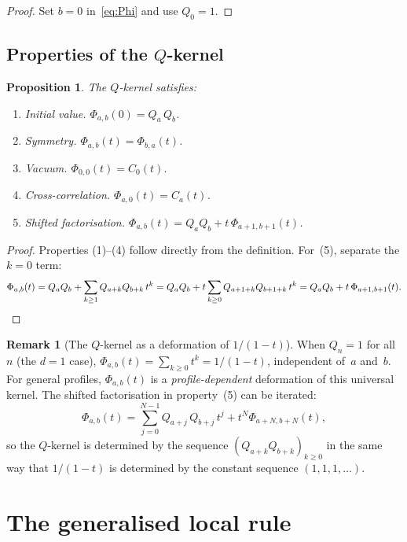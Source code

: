 \documentclass[11pt]{article}
\theoremstyle{plain}
\newtheorem{proposition}[theorem]{Proposition}
\theoremstyle{definition}
\newtheorem{remark}[theorem]{Remark}
\begin{document}
\begin{proof}
Set $b = 0$ in~\eqref{eq:Phi} and use $Q_0 = 1$.
\end{proof}

\subsection{Properties of the $Q$-kernel}

\begin{proposition}\label{prop:Phi-properties}
The $Q$-kernel satisfies:
\begin{enumerate}
  \item \emph{Initial value.}\;
    $\Phi_{a,b}(0) = Q_a\, Q_b$.
  \item \emph{Symmetry.}\;
    $\Phi_{a,b}(t) = \Phi_{b,a}(t)$.
  \item \emph{Vacuum.}\;
    $\Phi_{0,0}(t) = C_0(t)$.
  \item \emph{Cross-correlation.}\;
    $\Phi_{a,0}(t) = C_a(t)$.
  \item \emph{Shifted factorisation.}\;
    $\Phi_{a,b}(t) = Q_a Q_b + t\, \Phi_{a+1,b+1}(t)$.
\end{enumerate}
\end{proposition}

\begin{proof}
Properties (1)--(4) follow directly from the definition.
For~(5), separate the $k = 0$ term:
\[
  \Phi_{a,b}(t)
  = Q_a Q_b + \sum_{k \geq 1} Q_{a+k} Q_{b+k}\, t^k
  = Q_a Q_b + t \sum_{k \geq 0} Q_{a+1+k} Q_{b+1+k}\, t^k
  = Q_a Q_b + t\, \Phi_{a+1,b+1}(t). \qedhere
\]
\end{proof}

\begin{remark}[The $Q$-kernel as a deformation of $1/(1-t)$]
\label{rem:deformation}
When $Q_n = 1$ for all~$n$ (the $d = 1$ case),
$\Phi_{a,b}(t) = \sum_{k \geq 0} t^k = 1/(1-t)$, independent
of~$a$ and~$b$.  For general profiles, $\Phi_{a,b}(t)$ is a
\emph{profile-dependent} deformation of this universal kernel.
The shifted factorisation in property~(5) can be iterated:
\[
  \Phi_{a,b}(t)
  = \sum_{j=0}^{N-1} Q_{a+j}\, Q_{b+j}\, t^j
    + t^N \Phi_{a+N, b+N}(t),
\]
so the $Q$-kernel is determined by the sequence
$(Q_{a+k} Q_{b+k})_{k \geq 0}$ in the same way that $1/(1-t)$ is
determined by the constant sequence $(1, 1, 1, \ldots)$.
\end{remark}


\section{The generalised local rule}
\label{sec:gen-local-rule}
\end{document}
